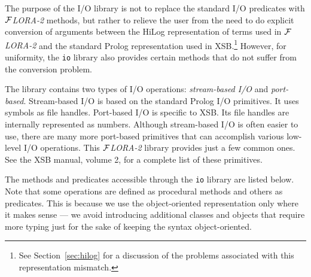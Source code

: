 \documentclass[11pt]{article}
\newcommand{\FLORA}{{\mbox{${\cal F}${\small\it LORA}\rm\emph{-2}}}\xspace}
\begin{document}
The purpose of the I/O library is not to replace the standard I/O predicates
with \FLORA methods, but rather to relieve the user from the need to do
explicit conversion of arguments between the HiLog representation of terms
used in \FLORA and the standard Prolog representation used in XSB.\footnote{
  See Section~\ref{sec:hilog} for a discussion of the problems associated
  with this representation mismatch.
  }
However, for uniformity, the {\tt io} library also provides certain methods
that do not suffer from the conversion problem.

The library contains two types of I/O operations: \emph{stream-based I/O}
and \emph{port-based}.  Stream-based I/O is based on the standard Prolog
I/O primitives. It uses symbols as file handles. Port-based I/O is specific
to XSB. Its file handles are internally represented as numbers. Although
stream-based I/O is often easier to use, there are many more port-based
primitives that can accomplish various low-level I/O operations. This
\FLORA library provides just a few common ones. See the XSB manual, volume
2, for a complete list of these primitives.

The methods and predicates accessible through the {\tt io} library are
listed below.  Note that some operations are defined as procedural methods
and others as predicates. This is because we use the object-oriented
representation only where it makes sense --- we avoid introducing
additional classes and objects that require more typing just for the sake
of keeping the syntax object-oriented.
\end{document}
